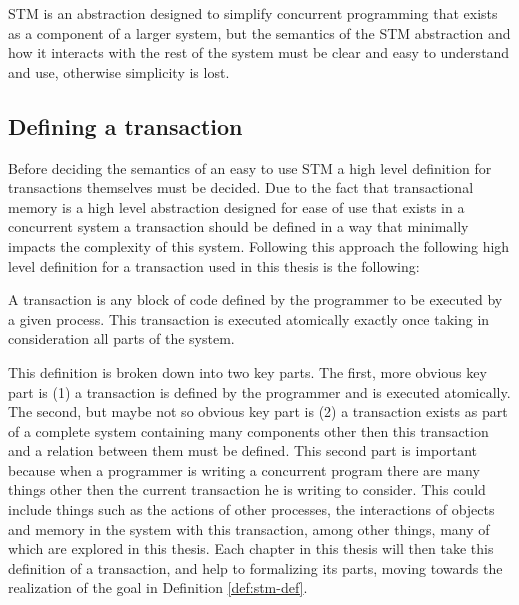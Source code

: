 \begin{definition}\label{def:stm-def}
STM is an abstraction designed to simplify concurrent programming that exists as a component of a larger system,
but the semantics of the STM abstraction and how it interacts with the rest of the system must be clear and easy to understand and use,
otherwise simplicity is lost.
\end{definition}

\subsection{Defining a transaction}
Before deciding the semantics of an easy to use STM a high level
definition for transactions themselves must be decided.
Due to the fact that transactional memory is a high level abstraction designed for ease of use
that exists in a concurrent system
a transaction should be defined in a way that minimally impacts the complexity
of this system.
Following this approach the following high level definition for a transaction
used in this thesis is the following:

\begin{definition}\label{def:trans-def}
A transaction is any block of
code defined by the programmer to be executed by a given process.
This transaction is executed atomically exactly once
taking in consideration all parts of the system.
\end{definition}

This definition is broken down into two key parts.
The first, more obvious key part is (1) a transaction is defined by the programmer
and is executed atomically.
The second, but maybe not so obvious key part is (2) a transaction exists
as part of a complete system containing many components other then this transaction and a relation between them must be
defined.
This second part is important because when a programmer is writing a concurrent program there are many things
other then the current transaction he is writing to consider.
This could include things such as the actions of other processes, the interactions
of objects and memory in the system with this transaction, among other things, many of
which are explored in this thesis.
Each chapter in this thesis will then take this definition of a transaction,
and help to formalizing its parts, moving towards the realization of the
goal in Definition \ref{def:stm-def}.


